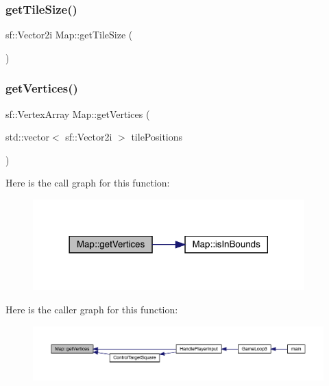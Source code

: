 \subsubsection{\texorpdfstring{get\+Tile\+Size()}{getTileSize()}}
{\footnotesize\ttfamily sf\+::\+Vector2i Map\+::get\+Tile\+Size (\begin{DoxyParamCaption}{ }\end{DoxyParamCaption})}

\mbox{\label{class_map_ace55cfcebed9b27fd2329a16ce4ab352}} 
\subsubsection{\texorpdfstring{get\+Vertices()}{getVertices()}}
{\footnotesize\ttfamily sf\+::\+Vertex\+Array Map\+::get\+Vertices (\begin{DoxyParamCaption}\item[{std\+::vector$<$ sf\+::\+Vector2i $>$}]{tile\+Positions }\end{DoxyParamCaption})}

Here is the call graph for this function\+:
\nopagebreak
\begin{figure}[H]
\begin{center}
\leavevmode
\includegraphics[width=297pt]{dd/d11/class_map_ace55cfcebed9b27fd2329a16ce4ab352_cgraph}
\end{center}
\end{figure}
Here is the caller graph for this function\+:
\nopagebreak
\begin{figure}[H]
\begin{center}
\leavevmode
\includegraphics[width=350pt]{dd/d11/class_map_ace55cfcebed9b27fd2329a16ce4ab352_icgraph}
\end{center}
\end{figure}
\mbox{\label{class_map_a1e9263abe2e1290fc383586c327f9f4a}} 
